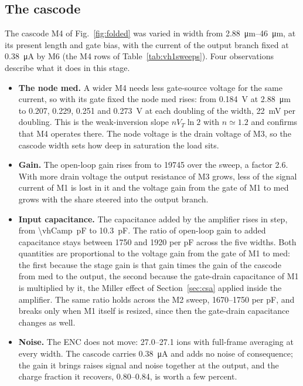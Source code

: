 \documentclass[11pt,a4paper]{article}
\begin{document}
\subsection{The cascode}
\label{sec:vh1cascode}
%
The cascode M4 of Fig.~\ref{fig:folded} was varied in width from
\SIrange{2.88}{46}{\um}, at its present length and gate bias, with the
current of the output branch fixed at \SI{0.38}{\micro A} by M6 (the M4
rows of Table~\ref{tab:vh1sweeps}). Four observations describe what it
does in this stage.
%
\begin{itemize}
\item \textbf{The node \textsf{med}.} A wider M4 needs less gate-source
  voltage for the same current, so with its gate fixed the node
  \textsf{med} rises: from \SI{0.184}{V} at \SI{2.88}{\um} to
  \SI{0.207}{}, \SI{0.229}{}, \SI{0.251}{} and \SI{0.273}{V} at each
  doubling of the width, \SI{22}{mV} per doubling. This is the
  weak-inversion slope $nV_T\ln2$ with $n\simeq1.2$ and confirms that M4
  operates there. The node voltage is the drain voltage of M3, so the
  cascode width sets how deep in saturation the load sits.
\item \textbf{Gain.} The open-loop gain rises from \vhAzero{} to
  \SI{19745}{} over the sweep, a factor \SI{2.6}{}. With more drain
  voltage the output resistance of M3 grows, less of the signal current
  of M1 is lost in it and the voltage gain from the gate of M1 to
  \textsf{med} grows with the share steered into the output branch.
\item \textbf{Input capacitance.} The capacitance added by the amplifier
  rises in step, from \SI{\vhCamp}{pF} to \SI{10.3}{pF}. The ratio of
  open-loop gain to added capacitance stays between \SI{1750}{} and
  \SI{1920}{} per \si{pF} across the five widths. Both quantities are
  proportional to the voltage gain from the gate of M1 to \textsf{med}:
  the first because the stage gain is that gain times the gain of the
  cascode from \textsf{med} to the output, the second because the
  gate-drain capacitance of M1 is multiplied by it, the Miller effect of
  Section~\ref{sec:csa} applied inside the amplifier. The same ratio holds
  across the M2 sweep, \SIrange{1670}{1750}{} per \si{pF}, and breaks only
  when M1 itself is resized, since then the gate-drain capacitance changes
  as well.
\item \textbf{Noise.} The ENC does not move: \SIrange{27.0}{27.1}{} ions
  with full-frame averaging at every width. The cascode carries
  \SI{0.38}{\micro A} and adds no noise of consequence; the gain it brings
  raises signal and noise together at the output, and the charge fraction
  it recovers, \SIrange{0.80}{0.84}{}, is worth a few percent.
\end{itemize}
\end{document}
